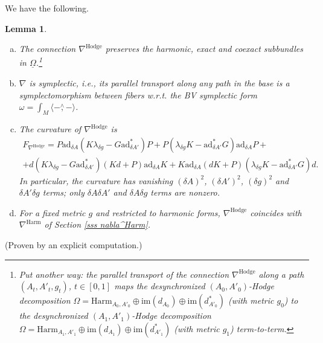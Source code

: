 \documentclass[11pt,a4paper]{amsart}
\theoremstyle{plain} %
\newtheorem{lem}[thm]{Lemma}
\theoremstyle{definition}
\theoremstyle{remark}
\newcommand{\mr}{\mathrm}
\newcommand{\ad}{\mathrm{ad}}
\newcommand{\ul}{\underline}
\begin{document}
{We have the following.
\begin{lem}\label{lemma: nabla^Hodge}
    \begin{enumerate}[(a)]
        \item \label{lemma: nabla^Hodge (a)} 
        The connection $\nabla^\mr{Hodge}$ preserves the harmonic, exact and coexact subbundles in $\ul\Omega$.\footnote{
        Put another way:
        the parallel transport of the connection $\nabla^\mr{Hodge}$ along a path $(A_t,A'_t,g_t)$, $t\in [0,1]$ maps the desynchronized $(A_0,A'_0)$-Hodge decomposition 
        $\Omega=\mr{Harm}_{A_0,A'_0}\oplus \mr{im}(d_{A_0})\oplus \mr{im}(d^*_{A'_0})$ (with metric $g_0$) to the desynchronized $(A_1,A'_1)$-Hodge decomposition  $\Omega=\mr{Harm}_{A_1,A'_1}\oplus \mr{im}(d_{A_1})\oplus \mr{im}(d^*_{A'_1})$ (with metric $g_1$) term-to-term.}
        \item\label{lemma: nabla^Hodge (b)}  $\nabla$ is symplectic, i.e., its parallel transport along any path in the base is a symplectomorphism between fibers w.r.t. the BV symplectic form $\omega=\int_M \langle - \stackrel{\wedge}{,} -\rangle$.
        \item \label{lemma: nabla^Hodge (c)} The curvature of $\nabla^\mr{Hodge}$ is
        \begin{multline}\label{F_nabla^Hodge}
            F_{\nabla^\mr{Hodge}}=P\ad_{\delta A}(K\lambda_{\delta g}-G\ad^*_{\delta A'})P+
        P(\lambda_{\delta g} K-\ad^*_{\delta A'}G)\ad_{\delta A} P+\\
        +d(K\lambda_{\delta g}-G\ad^*_{\delta A'})(Kd+P)\ad_{\delta A}K+K\ad_{\delta A}(dK+P)(\lambda_{\delta g} K-\ad^*_{\delta A'}G)d.
        \end{multline}
        In particular, the curvature has vanishing $(\delta A)^2$, $(\delta A')^2$, $(\delta g)^2$ and $\delta A' \delta g$ terms; only $\delta A \delta A'$ and $\delta A \delta g$ terms are nonzero.
        \item \label{lemma: nabla^Hodge (d)} For a fixed metric $g$ and restricted to harmonic forms, $\nabla^\mr{Hodge}$ coincides with $\nabla^\mr{Harm}$ of Section \ref{sss nabla^Harm}.
    \end{enumerate}
\end{lem}
(Proven by an explicit computation.)


}
\end{document}
